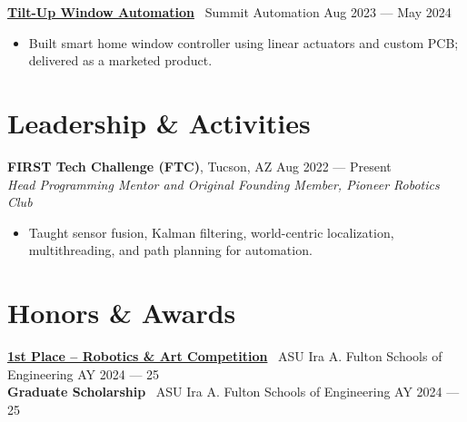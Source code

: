 \documentclass[10pt]{article}
\begin{document}
\textbf{\href{https://www.youtube.com/watch?v=i5I38tLkD6o}{Tilt-Up Window Automation}} \textbar\ Summit Automation \hfill Aug 2023 --- May 2024
\begin{itemize}
  \item Built smart home window controller using linear actuators and custom PCB; delivered as a marketed product.
\end{itemize}

\section*{Leadership \& Activities}
\textbf{FIRST Tech Challenge (FTC)}, Tucson, AZ \hfill Aug 2022 --- Present \\
\textit{Head Programming Mentor and Original Founding Member, Pioneer Robotics Club}
\begin{itemize}
  \item Taught sensor fusion, Kalman filtering, world-centric localization, multithreading, and path planning for automation.
\end{itemize}

\section*{Honors \& Awards}
\textbf{\href{https://www.linkedin.com/posts/mhgross_asuengineering-design-robotics-activity-7324315472491855873-Gn_C}{1st Place -- Robotics \& Art Competition}} \textbar\ ASU Ira A. Fulton Schools of Engineering \hfill AY 2024 --- 25 \\
\textbf{Graduate Scholarship} \textbar\ ASU Ira A. Fulton Schools of Engineering \hfill AY 2024 --- 25
\end{document}
